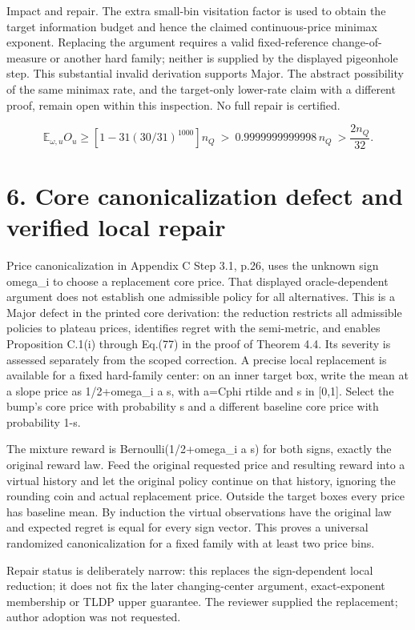 \documentclass[10pt]{article}
\begin{document}
Impact and repair. The extra small-bin visitation factor is used to obtain the target information budget and hence the claimed continuous-price minimax exponent. Replacing the argument requires a valid fixed-reference change-of-measure or another hard family; neither is supplied by the displayed pigeonhole step. This substantial invalid derivation supports Major. The abstract possibility of the same minimax rate, and the target-only lower-rate claim with a different proof, remain open within this inspection. No full repair is certified.\par
\[\mathbb E_{\omega,u}O_u\ge \left[1-31(30/\allowbreak{}31)^{1000}\right]n_Q\ >\ 0.9999999999998\,n_Q\ >\frac{2n_Q}{32}.\]\par
\section*{6. Core canonicalization defect and verified local repair}
Price canonicalization in Appendix C Step 3.1, p.26, uses the unknown sign omega\_i to choose a replacement core price. That displayed oracle-dependent argument does not establish one admissible policy for all alternatives. This is a Major defect in the printed core derivation: the reduction restricts all admissible policies to plateau prices, identifies regret with the semi-metric, and enables Proposition C.1(i) through Eq.(77) in the proof of Theorem 4.4. Its severity is assessed separately from the scoped correction. A precise local replacement is available for a fixed hard-family center: on an inner target box, write the mean at a slope price as 1/2+omega\_i a s, with a=Cphi rtilde and s in [0,1]. Select the bump’s core price with probability s and a different baseline core price with probability 1-s.\par
The mixture reward is Bernoulli(1/2+omega\_i a s) for both signs, exactly the original reward law. Feed the original requested price and resulting reward into a virtual history and let the original policy continue on that history, ignoring the rounding coin and actual replacement price. Outside the target boxes every price has baseline mean. By induction the virtual observations have the original law and expected regret is equal for every sign vector. This proves a universal randomized canonicalization for a fixed family with at least two price bins.\par
Repair status is deliberately narrow: this replaces the sign-dependent local reduction; it does not fix the later changing-center argument, exact-exponent membership or TLDP upper guarantee. The reviewer supplied the replacement; author adoption was not requested.\par
\end{document}

